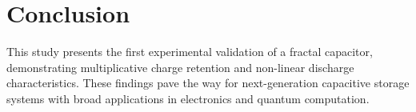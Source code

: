 \documentclass{article}
\theoremstyle{plain}
\begin{document}
\section{Conclusion}
This study presents the first experimental validation of a fractal capacitor, demonstrating multiplicative charge retention and non-linear discharge characteristics. These findings pave the way for next-generation capacitive storage systems with broad applications in electronics and quantum computation.

\nocite{*}


\end{document}
